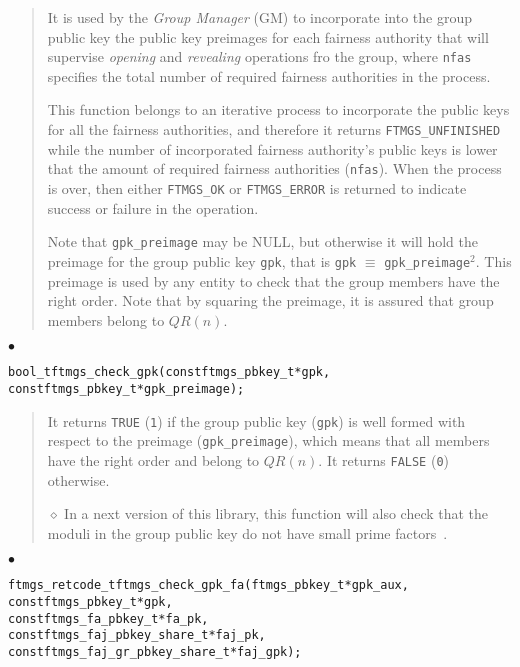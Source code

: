 \documentclass[a4paper]{article}
\newenvironment{api}%
{\noindent$\bullet$\hfill\begin{minipage}[t]{0.97\linewidth}\footnotesize\begin{alltt}}%
{\end{alltt}\end{minipage}}%
\begin{document}
\begin{quote}\footnotesize
It is used by the \emph{Group Manager} (GM) to incorporate into the
group public key the public key preimages for each fairness authority
that will supervise \emph{opening} and \emph{revealing} operations fro
the group, where \verb|nfas| specifies the total number of required
fairness authorities in the process.

This function belongs to an iterative process to incorporate the
public keys for all the fairness authorities, and therefore it returns
\verb|FTMGS_UNFINISHED| while the number of incorporated fairness
authority's public keys is lower that the amount of required fairness
authorities (\verb|nfas|). When the process is over, then
either \verb|FTMGS_OK| or \verb|FTMGS_ERROR| is returned to indicate
success or failure in the operation.

Note that \verb|gpk_preimage| may be NULL, but otherwise it will
hold the preimage for the group public key \verb|gpk|, that is 
\verb|gpk| $\equiv$ \verb|gpk_preimage|$^2$. This preimage is
used by any entity to check that the group members have the right
order. Note that by squaring the preimage, it is assured that group
members belong to $\mathit{QR}(n)$.
\end{quote}
\begin{api}
bool_t ftmgs_check_gpk(const ftmgs_pbkey_t* gpk,
                       const ftmgs_pbkey_t* gpk_preimage);
\end{api}
\begin{quote}\footnotesize
It returns \verb|TRUE| (\verb|1|) if the group public key (\verb|gpk|)
is well formed with respect to the preimage (\verb|gpk_preimage|),
which means that all members have the right order and belong to
$\mathit{QR}(n)$. It returns \verb|FALSE| (\verb|0|) otherwise.

$\diamond$ In a next version of this library, this function will also
check that the moduli in the group public key do not have small prime
factors~\cite{CM99}.
\end{quote}
\begin{api}
ftmgs_retcode_t ftmgs_check_gpk_fa(ftmgs_pbkey_t* gpk_aux,
                                   const ftmgs_pbkey_t* gpk,
                                   const ftmgs_fa_pbkey_t* fa_pk,
                                   const ftmgs_faj_pbkey_share_t* faj_pk,
                                   const ftmgs_faj_gr_pbkey_share_t* faj_gpk);
\end{api}
\end{document}
